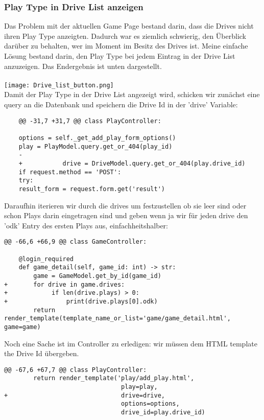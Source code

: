 \subsubsection{Play Type in Drive List anzeigen}
Das Problem mit der aktuellen Game Page bestand darin, dass die Drives nicht ihren Play Type anzeigten. Dadurch war es ziemlich schwierig, den Überblick darüber zu behalten, wer im Moment im Besitz des Drives ist. Meine einfache Lösung bestand darin, den Play Type bei jedem Eintrag in der Drive List anzuzeigen. Das Endergebnis ist unten dargestellt.
\\ \\
\texttt{[image: Drive\_list\_button.png]} \\

Damit der Play Type in der Drive List angezeigt wird, schicken wir zunächst eine query an die Datenbank und speichern die Drive Id in der 'drive' Variable:

\begin{verbatim}
	@@ -31,7 +31,7 @@ class PlayController:
	
	options = self._get_add_play_form_options()
	play = PlayModel.query.get_or_404(play_id)
	-
	+       	drive = DriveModel.query.get_or_404(play.drive_id)
	if request.method == 'POST':
	try:
	result_form = request.form.get('result')
\end{verbatim}


Daraufhin iterieren wir durch die drives um festzustellen ob sie leer sind oder schon Plays darin eingetragen sind und geben wenn ja wir für jeden drive den 'odk' Entry des ersten Plays aus, einfachheitshalber:

\begin{verbatim}
@@ -66,6 +66,9 @@ class GameController:
	
	@login_required
	def game_detail(self, game_id: int) -> str:
		game = GameModel.get_by_id(game_id)
+       for drive in game.drives:
+            if len(drive.plays) > 0:
+                print(drive.plays[0].odk)
		return render_template(template_name_or_list='game/game_detail.html', game=game)
\end{verbatim}

Noch eine Sache ist im Controller zu erledigen: wir müssen dem HTML template the Drive Id übergeben.

\begin{verbatim}
@@ -67,6 +67,7 @@ class PlayController:
        return render_template('play/add_play.html',
                                play=play,
+                               drive=drive,
                                options=options,
                                drive_id=play.drive_id)
\end{verbatim}

